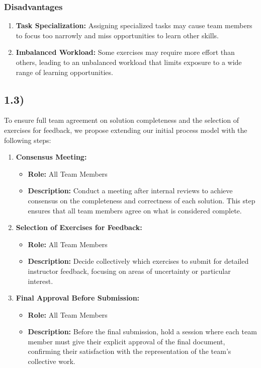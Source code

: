 \documentclass[a4paper]{scrartcl}
\begin{document}
\subsubsection*{Disadvantages}
\begin{enumerate}
    \item \textbf{Task Specialization:} Assigning specialized tasks may cause team members to focus too narrowly and miss opportunities to learn other skills.

    \item \textbf{Imbalanced Workload:} Some exercises may require more effort than others, leading to an unbalanced workload that limits exposure to a wide range of learning opportunities.

\end{enumerate}

\subsection*{1.3)}

To ensure full team agreement on solution completeness and the selection of exercises for feedback, we propose extending our initial process model with the following steps:

\begin{enumerate}
    \item \textbf{Consensus Meeting:}
    \begin{itemize}
        \item \textbf{Role:} All Team Members
        \item \textbf{Description:} Conduct a meeting after internal reviews to achieve consensus on the completeness and correctness of each solution. This step ensures that all team members agree on what is considered complete.
    \end{itemize}

    \item \textbf{Selection of Exercises for Feedback:}
    \begin{itemize}
        \item \textbf{Role:} All Team Members
        \item \textbf{Description:} Decide collectively which exercises to submit for detailed instructor feedback, focusing on areas of uncertainty or particular interest.
    \end{itemize}

    \item \textbf{Final Approval Before Submission:}
    \begin{itemize}
        \item \textbf{Role:} All Team Members
        \item \textbf{Description:} Before the final submission, hold a session where each team member must give their explicit approval of the final document, confirming their satisfaction with the representation of the team's collective work.
    \end{itemize}
\end{enumerate}
\end{document}
